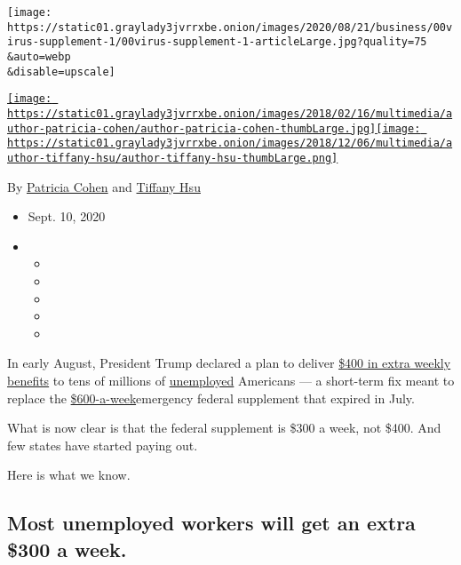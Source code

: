 \texttt{[image: https://static01.graylady3jvrrxbe.onion/images/2020/08/21/business/00virus-supplement-1/00virus-supplement-1-articleLarge.jpg?quality=75\\\&auto=webp\\\&disable=upscale]}

\href{https://www.nytimes3xbfgragh.onion/by/patricia-cohen}{\texttt{[image: https://static01.graylady3jvrrxbe.onion/images/2018/02/16/multimedia/author-patricia-cohen/author-patricia-cohen-thumbLarge.jpg]}}\href{https://www.nytimes3xbfgragh.onion/by/tiffany-hsu}{\texttt{[image: https://static01.graylady3jvrrxbe.onion/images/2018/12/06/multimedia/author-tiffany-hsu/author-tiffany-hsu-thumbLarge.png]}}

By \href{https://www.nytimes3xbfgragh.onion/by/patricia-cohen}{Patricia
Cohen} and
\href{https://www.nytimes3xbfgragh.onion/by/tiffany-hsu}{Tiffany Hsu}

\begin{itemize}
\item
  Sept. 10, 2020
\item
  \begin{itemize}
  \item
  \item
  \item
  \item
  \item
  \end{itemize}
\end{itemize}

In early August, President Trump declared a plan to deliver
\href{https://www.nytimes3xbfgragh.onion/2020/08/08/us/politics/trump-stimulus-bill-coronavirus.html}{\$400
in extra weekly benefits} to tens of millions of
\href{https://www.nytimes3xbfgragh.onion/2020/08/27/business/economy/unemployment-claims.html}{unemployed}
Americans --- a short-term fix meant to replace the
\href{https://www.nytimes3xbfgragh.onion/2020/07/29/business/economy/unemployment-benefits-coronavirus.html}{\$600-a-week}emergency
federal supplement that expired in July.

What is now clear is that the federal supplement is \$300 a week, not
\$400. And few states have started paying out.

Here is what we know.

\hypertarget{most-unemployed-workers-will-get-an-extra-300-a-week}{%
\subsection{Most unemployed workers will get an extra \$300 a
week.}\label{most-unemployed-workers-will-get-an-extra-300-a-week}}

